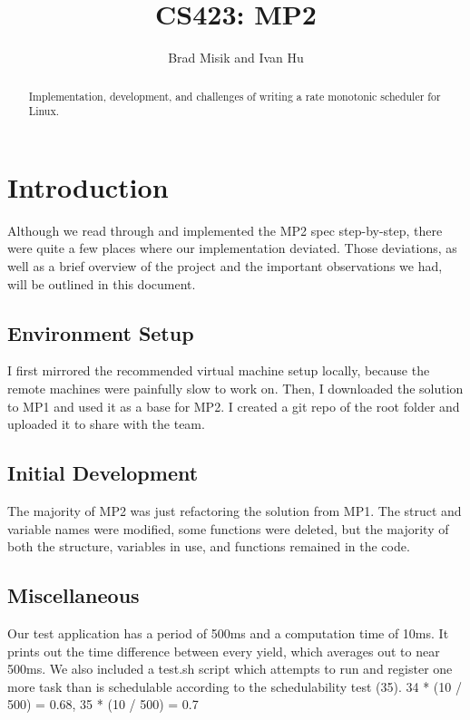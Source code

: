 \documentclass{article}
\begin{document}
\title{CS423: MP2{}}
\author{Brad Misik and Ivan Hu}

\maketitle

\begin{abstract}
Implementation, development, and challenges of writing a rate monotonic scheduler for Linux.
\end{abstract}

\section{Introduction}
Although we read through and implemented the MP2 spec step-by-step, there were quite a few places where our implementation deviated. Those deviations, as well as a brief overview of the project and the important observations we had, will be outlined in this document.

\subsection{Environment Setup}
I first mirrored the recommended virtual machine setup locally, because the remote machines were painfully slow to work on. Then, I downloaded the solution to MP1 and used it as a base for MP2. I created a git repo of the root folder and uploaded it to share with the team.

\subsection{Initial Development}
The majority of MP2 was just refactoring the solution from MP1. The struct and variable names were modified, some functions were deleted, but the majority of both the structure, variables in use, and functions remained in the code.

\subsection{Miscellaneous}
Our test application has a period of 500ms and a computation time of 10ms. It prints out the time difference between every yield, which averages out to near 500ms. We also included a test.sh script which attempts to run and register one more task than is schedulable according to the schedulability test (35). 34 * (10 / 500) = 0.68, 35 * (10 / 500) = 0.7
\end{document}

